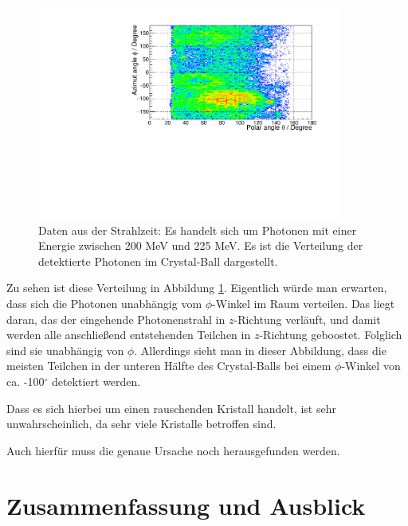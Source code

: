 \documentclass[a4paper,11pt,oneside,final,german,openbib,pdftex]{scrbook}
\begin{document}
{\begin{figure}[h!]
	\begin{center}
		\includegraphics[width=100mm]{NewCalib/ThetaPhiVerteilung/20172404ThetaPhi200MeVBeam}
		\caption[Strahlzeit: Verteilung der detektierten Photonen im CB]{Daten aus der Strahlzeit: Es handelt sich um Photonen mit einer Energie zwischen 200 MeV und 225 MeV. Es ist die Verteilung der detektierte Photonen im Crystal-Ball dargestellt.}
		\label{fig:Verteilung-der-Photonen-im-CB}
	\end{center}
\end{figure}
Zu sehen ist diese Verteilung in Abbildung \ref{fig:Verteilung-der-Photonen-im-CB}. Eigentlich w\"urde man erwarten, dass sich die Photonen unabh\"angig vom $\phi$-Winkel im Raum verteilen. Das liegt daran, das der eingehende Photonenstrahl in $z$-Richtung verl\"auft, und damit werden alle anschlie{\ss}end entstehenden Teilchen in $z$-Richtung geboostet. Folglich sind sie unabh\"angig von $\phi$. 
Allerdings sieht man in dieser Abbildung, dass die meisten Teilchen in der unteren H\"alfte des Crystal-Balls bei einem $\phi$-Winkel von ca. -100$^{\circ}$ detektiert werden.


Dass es sich hierbei um einen rauschenden Kristall handelt, ist sehr unwahrscheinlich, da sehr viele Kristalle betroffen sind.

Auch hierf\"ur muss die genaue Ursache noch herausgefunden werden.


\chapter{Zusammenfassung und Ausblick}
\label{chap:Zusammenfassung}

}
\end{document}
